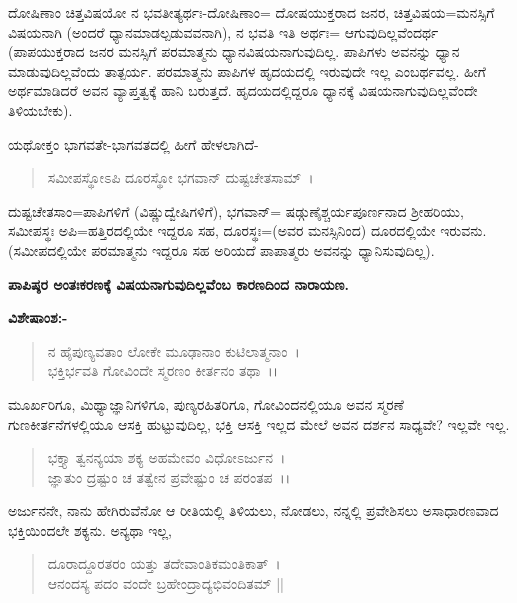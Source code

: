 ದೋಷಿಣಾಂ ಚಿತ್ತವಿಷಯೋ ನ ಭವತೀತ್ಯರ್ಥಃ-ದೋಷಿಣಾಂ= ದೋಷಯುಕ್ತರಾದ ಜನರ, ಚಿತ್ತವಿಷಯ=ಮನಸ್ಸಿಗೆ ವಿಷಯನಾಗಿ (ಅಂದರೆ ಧ್ಯಾನಮಾಡಲ್ಪಡುವವನಾಗಿ), ನ ಭವತಿ ಇತಿ ಅರ್ಥಃ= ಆಗುವುದಿಲ್ಲವೆಂದರ್ಥ (ಪಾಪಯುಕ್ತರಾದ ಜನರ ಮನಸ್ಸಿಗೆ ಪರಮಾತ್ಮನು ಧ್ಯಾನವಿಷಯನಾಗುವುದಿಲ್ಲ. ಪಾಪಿಗಳು ಅವನನ್ನು ಧ್ಯಾನ ಮಾಡುವುದಿಲ್ಲವೆಂದು ತಾತ್ಪರ್ಯ. ಪರಮಾತ್ಮನು ಪಾಪಿಗಳ ಹೃದಯದಲ್ಲಿ ಇರುವುದೇ ಇಲ್ಲ ಎಂಬರ್ಥವಲ್ಲ. ಹೀಗೆ ಅರ್ಥಮಾಡಿದರೆ ಅವನ ವ್ಯಾಪ್ತತ್ವಕ್ಕೆ ಹಾನಿ ಬರುತ್ತದೆ. ಹೃದಯದಲ್ಲಿದ್ದರೂ ಧ್ಯಾನಕ್ಕೆ ವಿಷಯನಾಗುವುದಿಲ್ಲವೆಂದೇ ತಿಳಿಯಬೇಕು).

ಯಥೋಕ್ತಂ ಭಾಗವತೇ-ಭಾಗವತದಲ್ಲಿ ಹೀಗೆ ಹೇಳಲಾಗಿದೆ-

\begin{verse}
ಸಮೀಪಸ್ಥೋಽಪಿ ದೂರಸ್ಥೋ ಭಗವಾನ್ ದುಷ್ಟಚೇತಸಾಮ್~।
\end{verse}

ದುಷ್ಟಚೇತಸಾಂ=ಪಾಪಿಗಳಿಗೆ (ವಿಷ್ಣುದ್ವೇಷಿಗಳಿಗೆ), ಭಗವಾನ್= ಷಡ್ಗುಣೈಶ್ಚರ್ಯಪೂರ್ಣನಾದ ಶ‍್ರೀಹರಿಯು, ಸಮೀಪಸ್ಥಃ ಅಪಿ=ಹತ್ತಿರದಲ್ಲಿಯೇ ಇದ್ದರೂ ಸಹ, ದೂರಸ್ಥಃ=(ಅವರ ಮನಸ್ಸಿನಿಂದ) ದೂರದಲ್ಲಿಯೇ ಇರುವನು. (ಸಮೀಪದಲ್ಲಿಯೇ ಪರಮಾತ್ಮನು ಇದ್ದರೂ ಸಹ ಅರಿಯದೆ ಪಾಪಾತ್ಮರು ಅವನನ್ನು ಧ್ಯಾನಿಸುವುದಿಲ್ಲ).

\begin{center}
\textbf{ಪಾಪಿಷ್ಠರ ಅಂತಃಕರಣಕ್ಕೆ ವಿಷಯನಾಗುವುದಿಲ್ಲವೆಂಬ ಕಾರಣದಿಂದ ನಾರಾಯಣ.}
\end{center}

\noindent
\textbf{ವಿಶೇಷಾಂಶ:-}

\begin{verse}
ನ ಹೈಪುಣ್ಯವತಾಂ ಲೋಕೇ ಮೂಢಾನಾಂ ಕುಟಿಲಾತ್ಮನಾಂ~।\\ ಭಕ್ತಿರ್ಭವತಿ ಗೋವಿಂದೇ ಸ್ಮರಣಂ ಕೀರ್ತನಂ ತಥಾ~।।
\end{verse}


ಮೂರ್ಖರಿಗೂ, ಮಿಥ್ಯಾಜ್ಞಾನಿಗಳಿಗೂ, ಪುಣ್ಯರಹಿತರಿಗೂ, ಗೋವಿಂದನಲ್ಲಿಯೂ ಅವನ ಸ್ಮರಣೆ ಗುಣಕೀರ್ತನೆಗಳಲ್ಲಿಯೂ ಆಸಕ್ತಿ ಹುಟ್ಟುವುದಿಲ್ಲ, ಭಕ್ತಿ ಆಸಕ್ತಿ ಇಲ್ಲದ ಮೇಲೆ ಅವನ ದರ್ಶನ ಸಾಧ್ಯವೇ? ಇಲ್ಲವೇ ಇಲ್ಲ.

\begin{verse}
ಭಕ್ತ್ಯಾ ತ್ವನನ್ಯಯಾ ಶಕ್ಯ ಅಹಮೇವಂ ವಿಧೋಽರ್ಜುನ~।\\ ಜ್ಞಾತುಂ ದ್ರಷ್ಟುಂ ಚ ತತ್ವೇನ ಪ್ರವೇಷ್ಟುಂ ಚ ಪರಂತಪ~।।
\end{verse}


ಅರ್ಜುನನೇ, ನಾನು ಹೇಗಿರುವೆನೋ ಆ ರೀತಿಯಲ್ಲಿ ತಿಳಿಯಲು, ನೋಡಲು, ನನ್ನಲ್ಲಿ ಪ್ರವೇಶಿಸಲು ಅಸಾಧಾರಣವಾದ ಭಕ್ತಿಯಿಂದಲೇ ಶಕ್ಯನು. ಅನ್ಯಥಾ ಇಲ್ಲ,

\begin{verse}
ದೂರಾದ್ದೂರತರಂ ಯತ್ತು ತದೇವಾಂತಿಕಮಂತಿಕಾತ್~।\\ ಆನಂದಸ್ಯ ಪದಂ ವಂದೇ ಬ್ರಹೇಂದ್ರಾದ್ಯಭಿವಂದಿತಮ್ ||
\end{verse}

